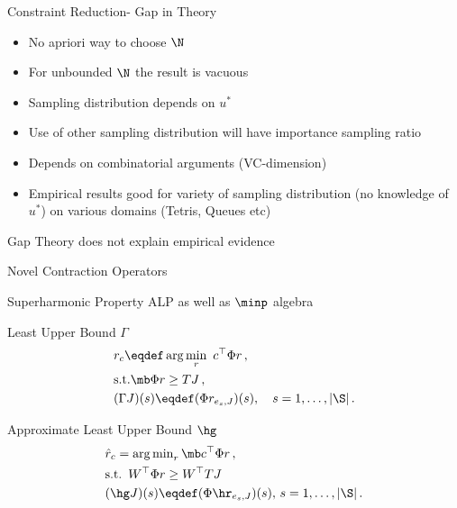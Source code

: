 \documentclass[handout,10pt]{beamer}
\begin{document}
\begin{frame}[fragile]{Constraint Reduction- Gap in Theory}
\begin{block}{\cite{de2004constraint}}
\begin{itemize}
\item No apriori way to choose $\N$
\item For unbounded $\N$ the result is vacuous
\item Sampling distribution depends on $u^*$
\item Use of other sampling distribution will have importance sampling ratio
\item Depends on combinatorial arguments (VC-dimension)
\item \cite{farias2006tetris,de2003linear,de2004constraint} Empirical results good for variety of sampling distribution (no knowledge of $u^*$) on various domains (Tetris, Queues etc)
\end{itemize}
\end{block}
\begin{block}{Gap}
Theory does not explain empirical evidence
\end{block}
\end{frame}



\begin{frame}[fragile]{Novel Contraction Operators}
\begin{block}{Superharmonic Property}
ALP as well as $\minp$ algebra
\end{block}
\begin{block}{Least Upper Bound $\Gamma$}
\begin{align*}
\begin{split}
&r_c\eqdef\arg\min_{r} \,\, c^\top \Phi r\,,\\
&\text{s.t.} \mb \Phi r\geq  TJ\,,\\
&(\Gamma J)(s)\eqdef(\Phi r_{e_s,J})(s),\quad s=1,\ldots,|\S|\,.
\end{split}
\end{align*}
\end{block}

\begin{block}{Approximate Least Upper Bound $\hg$}
\begin{align*}
&\hat{r}_c={\arg\min}_r \,\mb c^\top \Phi r\,,\\
&\text{s.t.} \,\,\, W^\top  \Phi r\geq W^\top TJ\,\\
&(\hg J)(s)\eqdef(\Phi \hr_{e_s,J})(s),\, s=1,\ldots,|\S|\,.
\end{align*}
\end{block}
\end{frame}
\end{document}
